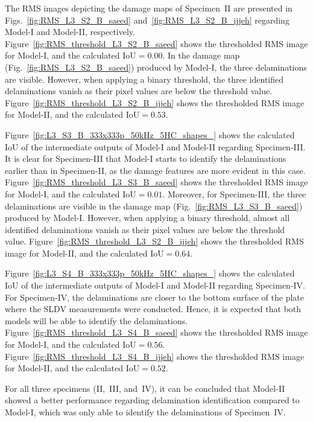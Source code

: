 \begin{sloppypar}
	The RMS images depicting the damage maps of Specimen~II are presented in Figs.~\ref{fig:RMS_L3_S2_B_saeed} and~\ref{fig:RMS_L3_S2_B_ijjeh} regarding Model-I and Model-II, respectively.
	Figure~\ref{fig:RMS_threshold_L3_S2_B_saeed} shows the thresholded RMS image for Model-I, and the calculated IoU\(=0.00\).
	In the damage map (Fig.~\ref{fig:RMS_L3_S2_B_saeed}) produced by Model-I, the three delaminations are visible.
	However, when applying a binary threshold, the three identified delaminations vanish as their pixel values are below the threshold value. 
	Figure~\ref{fig:RMS_threshold_L3_S2_B_ijjeh} shows the thresholded RMS image for Model-II, and the calculated IoU\(=0.53\).
	
	Figure~\ref{fig:L3_S3_B_333x333p_50kHz_5HC_shapes_} shows the calculated IoU of the intermediate outputs of Model-I and Model-II regarding Specimen-III.
	It is clear for Specimen-III that Model-I starts to identify the delaminations earlier than in Specimen-II, as the damage features are more evident in this case.
	Figure~\ref{fig:RMS_threshold_L3_S3_B_saeed} shows the thresholded RMS image for Model-I, and the calculated IoU\(=0.01\).
	Moreover, for Specimen-III, the three delaminations are visible in the damage map (Fig.~\ref{fig:RMS_L3_S3_B_saeed}) produced by Model-I.
	However, when applying a binary threshold, almost all identified delaminations vanish as their pixel values are below the threshold value.
	Figure~\ref{fig:RMS_threshold_L3_S2_B_ijjeh} shows the thresholded RMS image for Model-II, and the calculated IoU\(=0.64\).
	
	Figure~\ref{fig:L3_S4_B_333x333p_50kHz_5HC_shapes_} shows the calculated IoU of the intermediate outputs of Model-I and Model-II regarding Specimen-IV.
	For Specimen-IV, the delaminations are closer to the bottom surface of the plate where the SLDV measurements were conducted.
	Hence, it is expected that both models will be able to identify the delaminations.
	Figure~\ref{fig:RMS_threshold_L3_S4_B_saeed} shows the thresholded RMS image for Model-I, and the calculated IoU\(=0.56\).
	Figure~\ref{fig:RMS_threshold_L3_S4_B_ijjeh} shows the thresholded RMS image for Model-II, and the calculated IoU\(=0.52\).
	
	For all three specimens (II,~III, and~IV), it can be concluded that Model-II showed a better performance regarding delamination identification compared to Model-I, which was only able to identify the delaminations of Specimen~IV.


\end{sloppypar}
